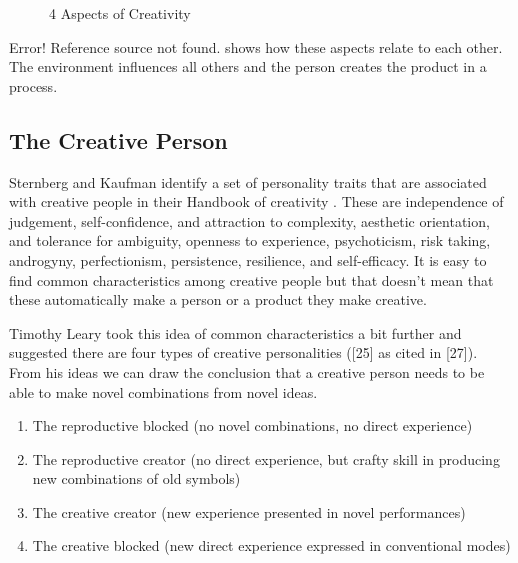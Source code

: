 \begin{figure}[!htbp] %
  \centering
  \tikzset{every fit/.append style=text badly centered}
  \caption[4 Aspects of Creativity]{4 Aspects of Creativity}
  \label{fig:4Crea}
\end{figure}

Error! Reference source not found. shows how these aspects relate to each other. The environment influences all others and the person creates the product in a process.

\subsection{The Creative Person}

Sternberg and Kaufman identify a set of personality traits that are associated with creative people in their Handbook of creativity \citep{Sternberg1988, Sternberg1999}. These are independence of judgement, self-confidence, and attraction to complexity, aesthetic orientation, and tolerance for ambiguity, openness to experience, psychoticism, risk taking, androgyny, perfectionism, persistence, resilience, and self-efficacy. It is easy to find common characteristics among creative people but that doesn't mean that these automatically make a person or a product they make creative.

Timothy Leary took this idea of common characteristics a bit further and suggested there are four types of creative personalities (\citep{}[25] as cited in [27]). From his ideas we can draw the conclusion that a creative person needs to be able to make novel combinations from novel ideas.

\begin{enumerate}
  \item The reproductive blocked (no novel combinations, no direct experience)
  \item The reproductive creator (no direct experience, but crafty skill in producing new combinations of old symbols)
  \item The creative creator (new experience presented in novel performances)
  \item The creative blocked (new direct experience expressed in conventional modes)
\end{enumerate}

